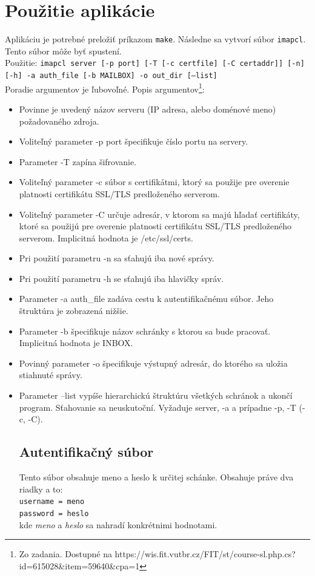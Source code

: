 \documentclass{article}
\begin{document}
\section{Použitie aplikácie}
Aplikáciu je potrebné preložiť príkazom \texttt{make}. Následne sa vytvorí súbor \texttt{imapcl}. Tento súbor môže byť spustení.\\
Použitie: \texttt{imapcl server [-p port] [-T [-c certfile] [-C certaddr]] [-n] [-h] -a auth\_file [-b MAILBOX] -o out\_dir [--list]}\\

Poradie argumentov je ľubovoľné. Popis argumentov\footnote{Zo zadania. Dostupné na https://wis.fit.vutbr.cz/FIT/st/course-sl.php.cs?id=615028\&item=59640\&cpa=1}:\\

\begin{itemize}
\item Povinne je uvedený názov serveru (IP adresa, alebo doménové meno) požadovaného zdroja.
\item    Voliteľný parameter -p port špecifikuje číslo portu na servery.
\item    Parameter -T zapína šifrovanie.
\item    Voliteľný parameter -c súbor s certifikátmi, ktorý sa použije pre overenie platnosti certifikátu SSL/TLS predloženého serverom.
\item    Voliteľný parameter -C určuje adresár, v ktorom sa majú hľadať certifikáty, ktoré sa použijú pre overenie platnosti certifikátu SSL/TLS predloženého serverom. Implicitná hodnota je /etc/ssl/certs.
\item    Pri použití parametru -n sa sťahujú iba nové správy.
\item    Pri použití parametru -h se sťahujú iba hlavičky správ.
\item    Parameter -a auth\_file zadáva cestu k autentifikačnému súbor. Jeho štruktúra je zobrazená nižšie.
\item    Parameter -b špecifikuje názov schránky s ktorou sa bude pracovať. Implicitná hodnota je INBOX.
\item    Povinný parameter -o špecifikuje výstupný adresár, do ktorého sa uložia stiahnuté správy.
\item   Parameter --list vypíše hierarchickú štruktúru všetkých schránok a ukončí program. Sťahovanie sa
    neuskutoční. Vyžaduje server, -a a prípadne -p, -T (-c, -C).

\subsection{Autentifikačný súbor}
Tento súbor obsahuje meno a heslo k určitej schánke. Obsahuje práve dva riadky a to:\\
\texttt{username = meno\\
password = heslo}\\
kde \textit{meno} a \textit{heslo} sa nahradí konkrétnimi hodnotami.

\end{itemize}
\end{document}
